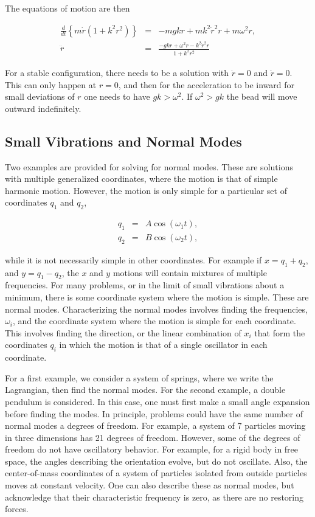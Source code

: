 \documentclass[%
oneside,                 %
final,                   %
10pt]{article}
\begin{document}
The equations of motion are then

\begin{eqnarray*}
\frac{d}{dt}\left\{m\dot{r}(1+k^2r^2)\right\}&=&-mgkr+mk^2\dot{r}^2r+m\omega^2r,\\
\ddot{r}&=&\frac{-gkr+\omega^2r-k^2\dot{r}^2r}{1+k^2r^2}
\end{eqnarray*}

For a stable configuration, there needs to be a solution with
$\dot{r}=0$ and $\ddot{r}=0$. This can only happen at $r=0$, and then
for the acceleration to be inward for small deviations of $r$ one
needs to have $gk>\omega^2$. If $\omega^2>gk$ the bead will move
outward indefinitely.

\subsection*{Small Vibrations and Normal Modes}

Two examples are provided for solving for normal modes. These are
solutions with multiple generalized coordinates, where the motion is
that of simple harmonic motion. However, the motion is only simple for
a particular set of coordinates $q_1$ and $q_2$,

\begin{eqnarray}
q_1&=&A\cos(\omega_1 t),\\
\nonumber
q_2&=&B\cos(\omega_2 t),
\end{eqnarray}

while it is not necessarily simple in other coordinates. For example
if $x=q_1+q_2$, and $y=q_1-q_2$, the $x$ and $y$ motions will contain
mixtures of multiple frequencies. For many problems, or in the limit
of small vibrations about a minimum, there is some coordinate system
where the motion is simple. These are normal modes. Characterizing the
normal modes involves finding the frequencies, $\omega_i$, and the
coordinate system where the motion is simple for each coordinate. This
involves finding the direction, or the linear combination of $x_i$
that form the coordinates $q_i$ in which the motion is that of a
single oscillator in each coordinate.

For a first example, we consider a system of springs, where we write
the Lagrangian, then find the normal modes. For the second example, a
double pendulum is considered. In this case, one must first make a
small angle expansion before finding the modes. In principle, problems
could have the same number of normal modes a degrees of freedom. For
example, a system of 7 particles moving in three dimensions has 21
degrees of freedom. However, some of the degrees of freedom do not
have oscillatory behavior. For example, for a rigid body in free
space, the angles describing the orientation evolve, but do not
oscillate. Also, the center-of-mass coordinates of a system of
particles isolated from outside particles moves at constant
velocity. One can also describe these as normal modes, but acknowledge
that their characteristic frequency is zero, as there are no restoring
forces.
\end{document}
